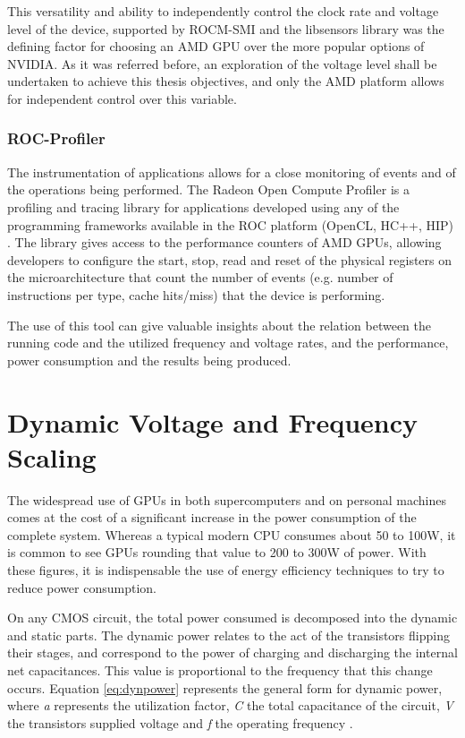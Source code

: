 This versatility and ability to independently control the clock rate and voltage level of the device, supported by ROCM-SMI and the libsensors library was the defining factor for choosing an AMD GPU over the more popular options of NVIDIA. As it was referred before, an exploration of the voltage level shall be undertaken to achieve this thesis objectives, and only the AMD platform allows for independent control over this variable.

\subsubsection{ROC-Profiler}

The instrumentation of applications allows for a close monitoring of events and of the operations being performed. The Radeon Open Compute Profiler \cite{noauthor_rocm-developer-tools/rocprofiler_2019} is a profiling and tracing library for applications developed using any of the programming frameworks available in the ROC platform (OpenCL, HC++, HIP) \cite{sun_evaluating_2018}. The library gives access to the performance counters of AMD GPUs, allowing developers to configure the start, stop, read and reset of the physical registers on the microarchitecture that count the number of events (e.g. number of instructions per type, cache hits/miss) that the device is performing.

The use of this tool can give valuable insights about the relation between the running code and the utilized frequency and voltage rates, and the performance, power consumption and the results being produced.




\section{Dynamic Voltage and Frequency Scaling}
\label{section:dcvf}

The widespread use of GPUs in both supercomputers and on personal machines comes at the cost of a significant increase in the power consumption of the complete system. Whereas a typical modern CPU consumes about 50 to 100W, it is common to see GPUs rounding that value to 200 to 300W of power. With these figures, it is indispensable the use of energy efficiency techniques to try to reduce power consumption.

On any CMOS circuit, the total power consumed is decomposed into the dynamic and static parts. The dynamic power relates to the act of the transistors flipping their stages, and correspond to the power of charging and discharging the internal net capacitances. This value is proportional to the frequency that this change occurs. Equation \ref{eq:dynpower} represents the general form for dynamic power, where \textit{a} represents the utilization factor, \textit{C} the total capacitance of the circuit, \textit{V} the transistors supplied voltage and \textit{f} the operating frequency \cite{gonzalez_supply_1997}.

